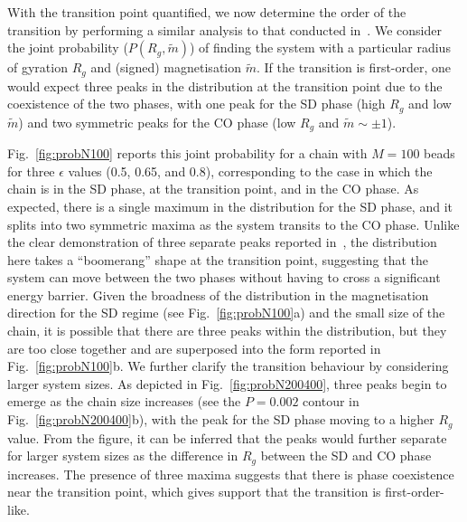 \documentclass[12pt]{article}
\begin{document}
With the transition point quantified, we now determine the order of the transition by performing a similar analysis to that conducted in~\cite{michieletto2016}. We consider the joint probability ($P(R_g,\widetilde{m})$) of finding the system with a particular radius of gyration $R_g$ and (signed) magnetisation $\widetilde{m}$. If the transition is first-order, one would expect three peaks in the distribution at the transition point due to the coexistence of the two phases, with one peak for the SD phase (high $R_g$ and low $\widetilde{m}$) and two symmetric peaks for the CO phase (low $R_g$ and $\widetilde{m} \sim \pm 1$). 

Fig.~\ref{fig:probN100} reports this joint probability for a chain with $M = 100$ beads for three $\epsilon$ values (0.5, 0.65, and 0.8), corresponding to the case in which the chain is in the SD phase, at the transition point, and in the CO phase. As expected, there is a single maximum in the distribution for the SD phase, and it splits into two symmetric maxima as the system transits to the CO phase.  Unlike the clear demonstration of three separate peaks reported in~\cite{michieletto2016}, the distribution here takes a ``boomerang'' shape at the transition point, suggesting that the system can move between the two phases without having to cross a significant energy barrier. Given the broadness of the distribution in the magnetisation direction for the SD regime (see Fig.~\ref{fig:probN100}a) and the small size of the chain, it is possible that there are three peaks within the distribution, but they are too close together and are superposed into the form reported in Fig.~\ref{fig:probN100}b. We further clarify the transition behaviour by considering larger system sizes. As depicted in Fig.~\ref{fig:probN200400}, three peaks begin to emerge as the chain size increases (see the $P = 0.002$ contour in Fig.~\ref{fig:probN200400}b), with the peak for the SD phase moving to a higher $R_g$ value. From the figure, it can be inferred that the peaks would further separate for larger system sizes as the difference in $R_g$ between the SD and CO phase increases. The presence of three maxima suggests that there is phase coexistence near the transition point, which gives support that the transition is first-order-like. 
\end{document}
